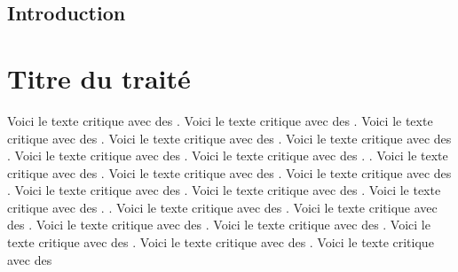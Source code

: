 \documentclass[openany]{book}
\begin{document}
\frontmatter
\chapter{Introduction}
\lipsum

\mainmatter
\part*{Titre du traité}
{}
\begin{pages}
  \begin{Leftside}
    \beginnumbering
    \pstart
    \lipsum[1]
    \pend
    \pstart
    \lipsum[1]
    \pend
    \pstart
    \lipsum[1]
    \pend
    \pstart
    \lipsum[1]
    \pend
    \pstart
    \lipsum[1]
    \pend
    \endnumbering
  \end{Leftside}
  \begin{Rightside}
    \beginnumbering
    \pstart
    Voici le texte critique avec des
    . Voici le texte critique avec des
    . Voici le texte critique avec des
    . Voici le texte critique avec des
    . Voici le texte critique avec des
    . Voici le texte critique avec des
    . Voici le texte critique avec des
    . 
    . Voici le texte critique avec des
    . Voici le texte critique avec des
    . Voici le texte critique avec des
    . Voici le texte critique avec des
    . Voici le texte critique avec des
    . Voici le texte critique avec des
    . 
    . Voici le texte critique avec des
    . Voici le texte critique avec des
    . Voici le texte critique avec des
    . Voici le texte critique avec des
    . Voici le texte critique avec des
    . Voici le texte critique avec des
    . 
    \pend
    \pstart
    Voici le texte critique avec des

\end{Rightside}
\end{pages}
\end{document}
